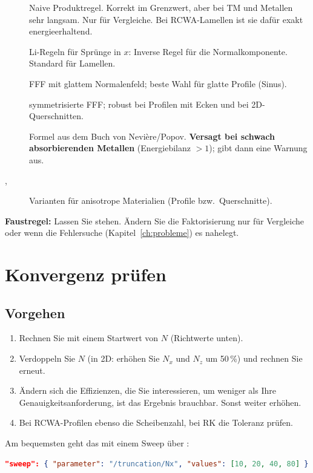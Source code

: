 \begin{description}
  \item[] Naive Produktregel. Korrekt im Grenzwert, aber bei TM und Metallen sehr langsam. Nur für
        Vergleiche. Bei RCWA-Lamellen ist sie dafür exakt energieerhaltend.
  \item[] Li-Regeln für Sprünge in $x$: Inverse Regel für die Normalkomponente. Standard für
        Lamellen.
  \item[] FFF mit glattem Normalenfeld; beste Wahl für glatte Profile (Sinus).
  \item[] symmetrisierte FFF; robust bei Profilen mit Ecken und bei 2D-Querschnitten.
  \item[] Formel aus dem Buch von Nevière/Popov. \textbf{Versagt bei schwach absorbierenden Metallen}
        (Energiebilanz $>1$); \FG{} gibt dann eine Warnung aus.
  \item[, ] Varianten für anisotrope Materialien (Profile bzw.\ Querschnitte).
\end{description}
\textbf{Faustregel:} Lassen Sie  stehen. Ändern Sie die Faktorisierung nur für Vergleiche oder wenn die
Fehlersuche (Kapitel~\ref{ch:probleme}) es nahelegt.

\section{Konvergenz prüfen}\label{sec:konvergenz}
%
\subsection{Vorgehen}
\begin{enumerate}
  \item Rechnen Sie mit einem Startwert von $N$ (Richtwerte unten).
  \item Verdoppeln Sie $N$ (in 2D: erhöhen Sie $N_x$ und $N_z$ um 50\,\%) und rechnen Sie erneut.
  \item Ändern sich die Effizienzen, die Sie interessieren, um weniger als Ihre Genauigkeitsanforderung, ist das
        Ergebnis brauchbar. Sonst weiter erhöhen.
  \item Bei RCWA-Profilen ebenso die Scheibenzahl, bei RK die Toleranz prüfen.
\end{enumerate}
Am bequemsten geht das mit einem Sweep über :
\begin{lstlisting}[language=json]
"sweep": { "parameter": "/truncation/Nx", "values": [10, 20, 40, 80] }
\end{lstlisting}

